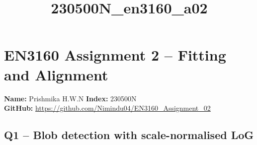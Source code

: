 \documentclass[11pt]{article}
\title{230500N\_en3160\_a02}
\begin{document}
    
    \maketitle
    
    

    
    \section{EN3160 Assignment 2 -- Fitting and
Alignment}\label{en3160-assignment-2-fitting-and-alignment}

\textbf{Name:} Prishmika H.W.N \textbf{Index:} 230500N\\
\textbf{GitHub:} \url{https://github.com/Nimindu04/EN3160_Assignment_02}

    \subsection{Q1 -- Blob detection with scale-normalised
LoG}\label{q1-blob-detection-with-scale-normalised-log}
\end{document}
